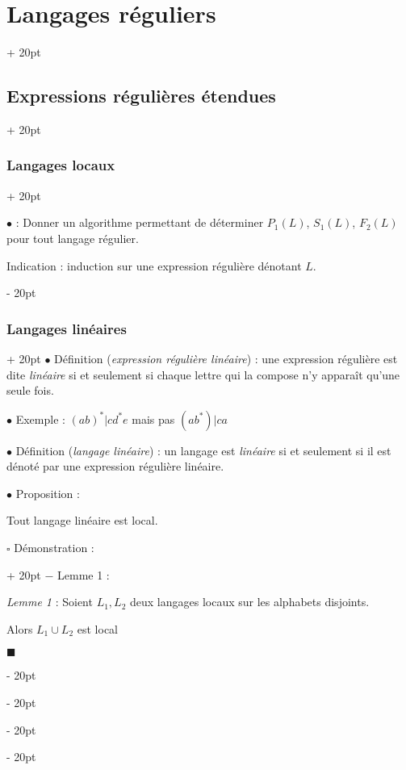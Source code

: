 \documentclass[a4paper, 12pt, twoside]{article}
\newcommand{\ind}[1][20pt]{\advance\leftskip + #1}
\newcommand{\deind}[1][20pt]{\advance\leftskip - #1}
\newenvironment{indt}[2][20pt]{#2 \par \ind[#1]}{\par \deind} %
\newenvironment{proof}[1][{Démonstration :}]{\begin{indt}{$\square$ #1}}{$\blacksquare$ \end{indt}}
\begin{document}
\begin{indt}{\section{Langages réguliers}}
\begin{indt}{\subsection{Expressions régulières étendues}}
\begin{indt}{\subsubsection{Langages locaux}}
                \vspace{12pt}
                
                $\bullet$  : Donner un algorithme permettant de déterminer $P_1(L)$, $S_1(L)$, $F_2(L)$ pour tout langage régulier.

                Indication : induction sur une expression régulière dénotant $L$.
            \end{indt}

            \vspace{12pt}
            
            \begin{indt}{\subsubsection{Langages linéaires}}
                $\bullet$ Définition (\emph{expression régulière linéaire}) : une expression régulière est dite \emph{linéaire} si et seulement si chaque lettre qui la compose n'y apparaît qu'une seule fois.

                \vspace{12pt}
                
                $\bullet$ Exemple : $(ab)^* | cd^*e$ mais pas $(ab^*)|ca$

                \vspace{12pt}
                
                $\bullet$ Définition (\emph{langage linéaire}) : un langage est \emph{linéaire} si et seulement si il est dénoté par une expression régulière linéaire.

                \vspace{12pt}
                
                $\bullet$ Proposition :
                \begin{emphBox}
                    Tout langage linéaire est local.
                \end{emphBox}

                \vspace{6pt}
                
                \begin{proof}
                    $-$ Lemme 1 :
                    \begin{emphBox}
                        \textit{Lemme 1} :
                        Soient $L_1, L_2$ deux langages locaux sur les alphabets disjoints.

                        Alors $L_1 \cup L_2$ est local
                    \end{emphBox}


\end{proof}
\end{indt}
\end{indt}
\end{indt}
\end{document}
